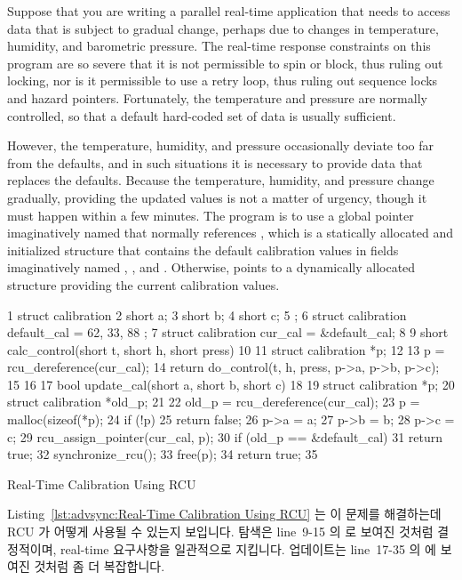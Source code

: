 Suppose that you are writing a parallel real-time application that needs
to access
data that is subject to gradual change, perhaps due to changes in
temperature, humidity, and barometric pressure.
The real-time response constraints on this program are so severe that
it is not permissible to spin or block, thus ruling out locking,
nor is it permissible to use a retry loop, thus ruling out sequence locks
and hazard pointers.
Fortunately, the temperature and pressure are normally controlled,
so that a default hard-coded set of data is usually sufficient.

However, the temperature, humidity, and pressure occasionally deviate too far
from the defaults, and in such situations it is necessary to provide
data that replaces the defaults.
Because the temperature, humidity, and pressure change gradually,
providing the updated values is not a matter of urgency, though
it must happen within a few minutes.
The program is to use a global pointer imaginatively named 
that normally references , which is a statically allocated
and initialized structure that contains the default calibration values
in fields imaginatively named , , and .
Otherwise,  points to a dynamically allocated
structure providing the current calibration values.
\fi

\begin{listing}[tb]
{ \scriptsize
\begin{verbbox}
 1 struct calibration {
 2   short a;
 3   short b;
 4   short c;
 5 };
 6 struct calibration default_cal = { 62, 33, 88 };
 7 struct calibration cur_cal = &default_cal;
 8
 9 short calc_control(short t, short h, short press)
10 {
11   struct calibration *p;
12
13   p = rcu_dereference(cur_cal);
14   return do_control(t, h, press, p->a, p->b, p->c);
15 }
16
17 bool update_cal(short a, short b, short c)
18 {
19   struct calibration *p;
20   struct calibration *old_p;
21
22   old_p = rcu_dereference(cur_cal);
23   p = malloc(sizeof(*p);
24   if (!p)
25     return false;
26   p->a = a;
27   p->b = b;
28   p->c = c;
29   rcu_assign_pointer(cur_cal, p);
30   if (old_p == &default_cal)
31     return true;
32   synchronize_rcu();
33   free(p);
34   return true;
35 }
\end{verbbox}
}
\centering
\theverbbox
\caption{Real-Time Calibration Using RCU}
\label{lst:advsync:Real-Time Calibration Using RCU}
\end{listing}

Listing~\ref{lst:advsync:Real-Time Calibration Using RCU}
는 이 문제를 해결하는데 RCU 가 어떻게 사용될 수 있는지 보입니다.
탐색은 line~9-15 의  로 보여진 것처럼 결정적이며, real-time
요구사항을 일관적으로 지킵니다.
업데이트는 line~17-35 의  에 보여진 것처럼 좀 더 복잡합니다.
\iffalse

